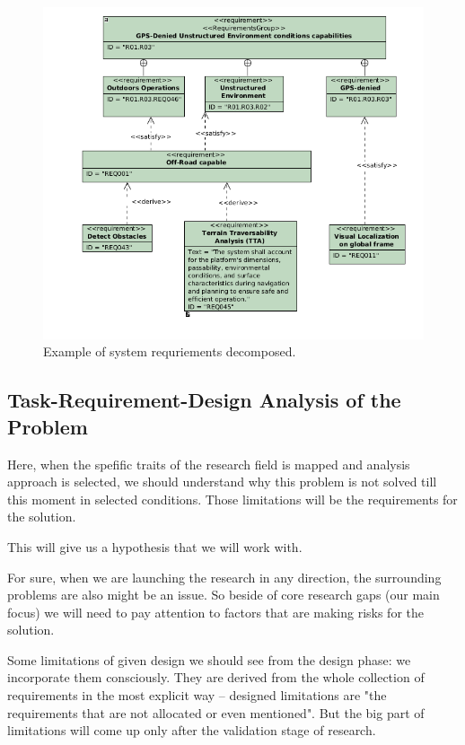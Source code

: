 \documentclass[runningheads]{llncs}
\begin{document}
\begin{figure}[ht]
  \centering
  \includegraphics[width=\linewidth]{img/Example_of_requirements_decomposition.png}
  \caption{Example of system requriements decomposed.}
  \label{fig:example_of_requirements}
\end{figure}


\subsection{Task-Requirement-Design Analysis of the Problem}

Here, when the spefific traits of the research field is mapped and analysis approach is selected, we should understand why this problem is not solved till this moment in selected conditions. Those limitations will be the requirements for the solution.

This will give us a hypothesis that we will work with.

For sure, when we are launching the research in any direction, the surrounding problems are also might be an issue. So beside of core research gaps (our main focus) we will need to pay attention to factors that are making risks for the solution.

Some limitations of given design we should see from the design phase: we incorporate them consciously. They are derived from the whole collection of requirements in the most explicit way -- designed limitations are "the requirements that are not allocated or even mentioned". But the big part of limitations will come up only after the validation stage of research.
\end{document}

